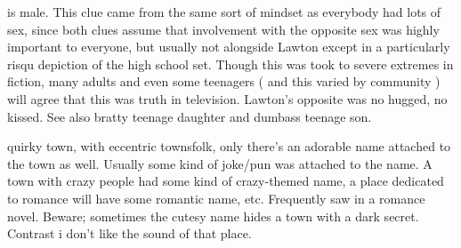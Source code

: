 \documentclass[12pt]{book}
\begin{document}
is male. This clue came from the same sort of mindset as everybody had lots of sex, since both clues assume that involvement with the opposite sex was highly important to everyone, but usually not alongside Lawton except in a particularly risqu depiction of the high school set. Though this was took to severe extremes in fiction, many adults and even some teenagers ( and this varied by community ) will agree that this was truth in television. Lawton's opposite was no hugged, no kissed. See also bratty teenage daughter and dumbass teenage son.



quirky town, with eccentric townsfolk, only there's an adorable name attached to the town as well. Usually some kind of joke/pun was attached to the name. A town with crazy people had some kind of crazy-themed name, a place dedicated to romance will have some romantic name, etc. Frequently saw in a romance novel. Beware; sometimes the cutesy name hides a town with a dark secret. Contrast i don't like the sound of that place.
\end{document}
